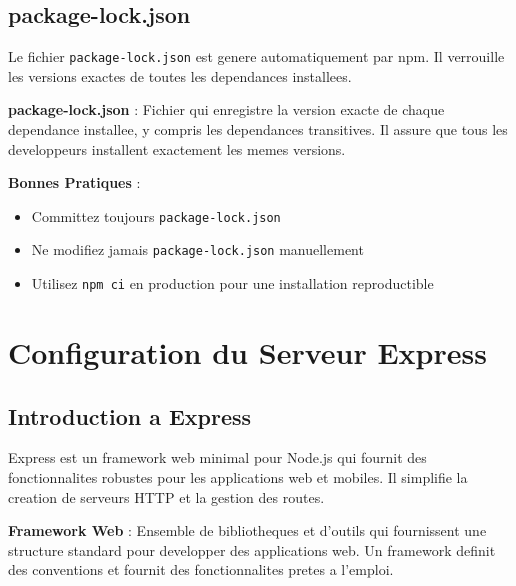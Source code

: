 \documentclass[a4paper,12pt]{book}
\begin{document}
\section{package-lock.json}

Le fichier \texttt{package-lock.json} est genere automatiquement par npm. Il verrouille les versions exactes de toutes les dependances installees.

\begin{definitionbox}
    \textbf{package-lock.json} : Fichier qui enregistre la version exacte de chaque dependance installee, y compris les dependances transitives. Il assure que tous les developpeurs installent exactement les memes versions.
\end{definitionbox}

\begin{bestpracticebox}
    \textbf{Bonnes Pratiques} :
    \begin{itemize}
        \item Committez toujours \texttt{package-lock.json}
        \item Ne modifiez jamais \texttt{package-lock.json} manuellement
        \item Utilisez \texttt{npm ci} en production pour une installation reproductible
    \end{itemize}
\end{bestpracticebox}

\chapter{Configuration du Serveur Express}

\section{Introduction a Express}

Express est un framework web minimal pour Node.js qui fournit des fonctionnalites robustes pour les applications web et mobiles. Il simplifie la creation de serveurs HTTP et la gestion des routes.

\begin{definitionbox}
    \textbf{Framework Web} : Ensemble de bibliotheques et d'outils qui fournissent une structure standard pour developper des applications web. Un framework definit des conventions et fournit des fonctionnalites pretes a l'emploi.
\end{definitionbox}
\end{document}
